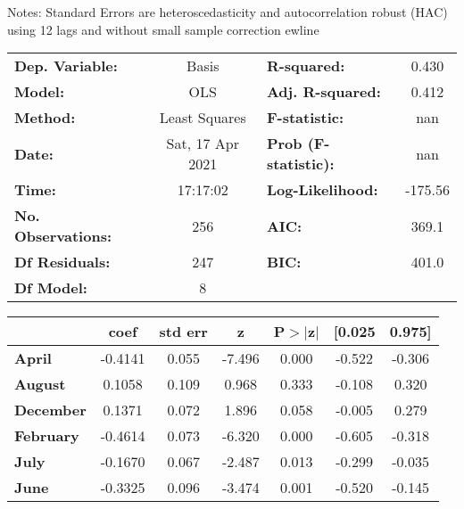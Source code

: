 Notes: \newline
 [1] Standard Errors are heteroscedasticity and autocorrelation robust (HAC) using 12 lags and without small sample correction
ewline\begin{center}
\begin{tabular}{lclc}
\toprule
\textbf{Dep. Variable:}    &      Basis       & \textbf{  R-squared:         } &     0.430   \\
\textbf{Model:}            &       OLS        & \textbf{  Adj. R-squared:    } &     0.412   \\
\textbf{Method:}           &  Least Squares   & \textbf{  F-statistic:       } &       nan   \\
\textbf{Date:}             & Sat, 17 Apr 2021 & \textbf{  Prob (F-statistic):} &      nan    \\
\textbf{Time:}             &     17:17:02     & \textbf{  Log-Likelihood:    } &   -175.56   \\
\textbf{No. Observations:} &         256      & \textbf{  AIC:               } &     369.1   \\
\textbf{Df Residuals:}     &         247      & \textbf{  BIC:               } &     401.0   \\
\textbf{Df Model:}         &           8      & \textbf{                     } &             \\
\bottomrule
\end{tabular}
\begin{tabular}{lcccccc}
                  & \textbf{coef} & \textbf{std err} & \textbf{z} & \textbf{P$> |$z$|$} & \textbf{[0.025} & \textbf{0.975]}  \\
\midrule
\textbf{April}    &      -0.4141  &        0.055     &    -7.496  &         0.000        &       -0.522    &       -0.306     \\
\textbf{August}   &       0.1058  &        0.109     &     0.968  &         0.333        &       -0.108    &        0.320     \\
\textbf{December} &       0.1371  &        0.072     &     1.896  &         0.058        &       -0.005    &        0.279     \\
\textbf{February} &      -0.4614  &        0.073     &    -6.320  &         0.000        &       -0.605    &       -0.318     \\
\textbf{July}     &      -0.1670  &        0.067     &    -2.487  &         0.013        &       -0.299    &       -0.035     \\
\textbf{June}     &      -0.3325  &        0.096     &    -3.474  &         0.001        &       -0.520    &       -0.145     \\

\end{tabular}
\end{center}

